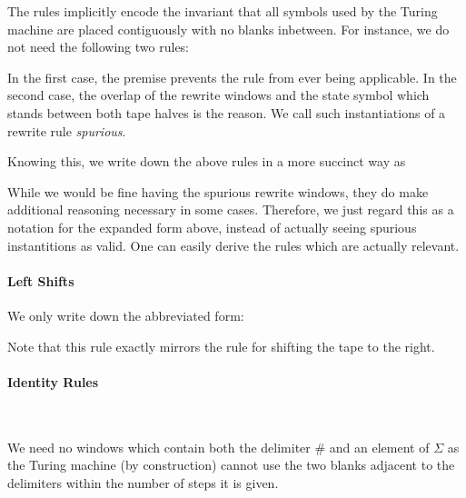 The rules implicitly encode the invariant that all symbols used by the Turing machine are placed contiguously with no blanks inbetween. For instance, we do not need the following two rules:
\begin{center}
  \quad
\end{center}
In the first case, the premise prevents the rule from ever being applicable. In the second case, the overlap of the rewrite windows and the state symbol which stands between both tape halves is the reason. 
We call such instantiations of a rewrite rule \emph{spurious}.

Knowing this, we write down the above rules in a more succinct way as 
\begin{center}
\end{center}
While we would be fine having the spurious rewrite windows, they do make additional reasoning necessary in some cases. Therefore, we just regard this as a notation for the expanded form above, instead of actually seeing spurious instantitions as valid. One can easily derive the rules which are actually relevant.

\paragraph{Left Shifts}
We only write down the abbreviated form:
\begin{center}
\end{center}
Note that this rule exactly mirrors the rule for shifting the tape to the right.

\paragraph{Identity Rules}
\begin{center}
  \\
  \trewwin{\#}{\blank}{\blank}{\#}{\blank}{\blank} 
  \quad \trewwin{\blank}{\blank}{\#}{\blank}{\blank}{\#}
\end{center}
We need no windows which contain both the delimiter $\#$ and an element of $\Sigma$ as the Turing machine (by construction) cannot use the two blanks adjacent to the delimiters within the number of steps it is given.

